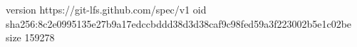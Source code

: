 version https://git-lfs.github.com/spec/v1
oid sha256:8c2e0995135e27b9a17edccbddd38d3d38caf9c98fed59a3f223002b5e1c02be
size 159278
